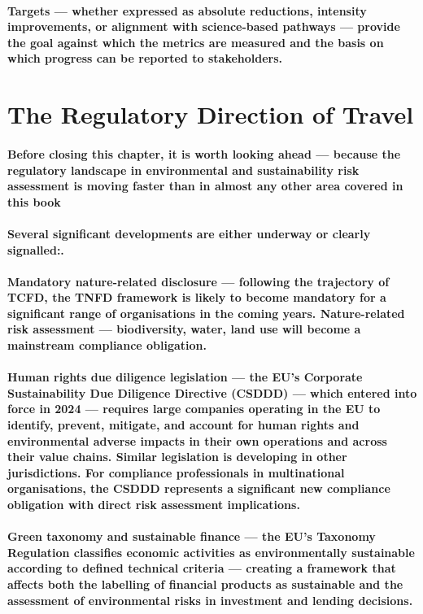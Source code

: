\paragraph{Targets — whether expressed as absolute reductions, intensity improvements, or alignment with science-based pathways — provide the goal against which the metrics are measured and the basis on which progress can be reported to stakeholders.}

\section{The Regulatory Direction of Travel}
\paragraph{Before closing this chapter, it is worth looking ahead — because the regulatory landscape in environmental and sustainability risk assessment is moving faster than in almost any other area covered in this book}
\paragraph{Several significant developments are either underway or clearly signalled:.}
\paragraph{\textbf{Mandatory nature-related disclosure} — following the trajectory of TCFD, the TNFD framework is likely to become mandatory for a significant range of organisations in the coming years. Nature-related risk assessment — biodiversity, water, land use will become a mainstream compliance obligation.}
\paragraph{\textbf{Human rights due diligence legislation} — the EU's \textbf{Corporate Sustainability Due Diligence Directive (CSDDD)} — which entered into force in 2024 — requires large companies operating in the EU to identify, prevent, mitigate, and account for human rights and environmental adverse impacts in their own operations and across their value chains. Similar legislation is developing in other jurisdictions. For compliance professionals in multinational organisations, the CSDDD represents a significant new compliance obligation with direct risk assessment implications.}
\paragraph{\textbf{Green taxonomy and sustainable finance} — the EU's \textbf{Taxonomy Regulation} classifies economic activities as environmentally sustainable according to defined technical criteria — creating a framework that affects both the labelling of financial products as sustainable and the assessment of environmental risks in investment and lending decisions.}
